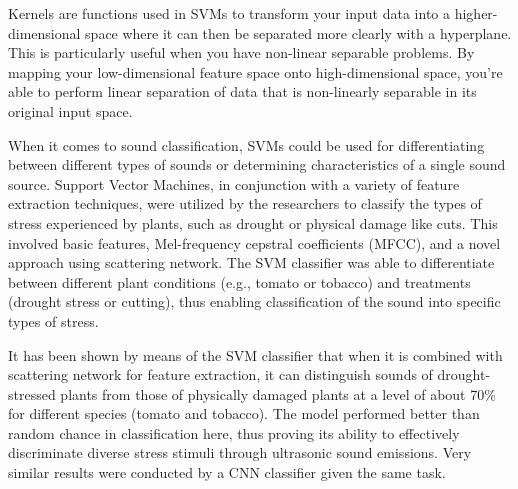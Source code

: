 Kernels are functions used in SVMs to transform your input data into a higher-dimensional space where it can then be separated more clearly with a hyperplane. This is particularly useful when you have non-linear separable problems. By mapping your low-dimensional feature space onto high-dimensional space, you're able to perform linear separation of data that is non-linearly separable in its original input space. \cite{mammone_support_2009}

When it comes to sound classification, SVMs could be used for differentiating between different types of sounds or determining characteristics of a single sound source. Support Vector Machines, in conjunction with a variety of feature extraction techniques, were utilized by the researchers to classify the types of stress experienced by plants, such as drought or physical damage like cuts. This involved basic features, Mel-frequency cepstral coefficients (MFCC), and a novel approach using scattering network. The SVM classifier was able to differentiate between different plant conditions (e.g., tomato or tobacco) and treatments (drought stress or cutting), thus enabling classification of the sound into specific types of stress.\cite{Cell_Sounds_emitted_by_plants}

It has been shown by means of the SVM classifier that when it is combined with scattering network for feature extraction, it can distinguish sounds of drought-stressed plants from those of physically damaged plants at a level of about 70\% for different species (tomato and tobacco). The model performed better than random chance in classification here, thus proving its ability to effectively discriminate diverse stress stimuli through ultrasonic sound emissions. Very similar results were conducted by a CNN classifier given the same task.\cite{Cell_Sounds_emitted_by_plants}


